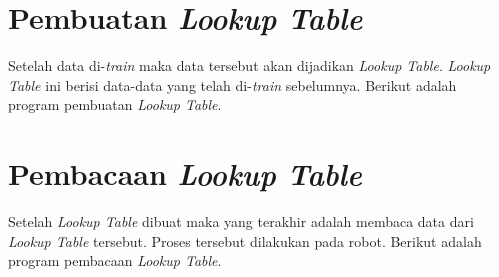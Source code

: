 \section{Pembuatan \textit{Lookup Table}
  \label{sec:pembuatanlut}}

Setelah data di-\textit{train} maka data tersebut akan dijadikan \textit{Lookup Table}. \textit{Lookup Table} ini berisi data-data yang telah di-\textit{train} sebelumnya. Berikut adalah program pembuatan \textit{Lookup Table}.



\section{Pembacaan \textit{Lookup Table}
  \label{sec:pembacaanlut}}

Setelah \textit{Lookup Table} dibuat maka yang terakhir adalah membaca data dari \textit{Lookup Table} tersebut. Proses tersebut dilakukan pada robot. Berikut adalah program pembacaan \textit{Lookup Table}.

 
